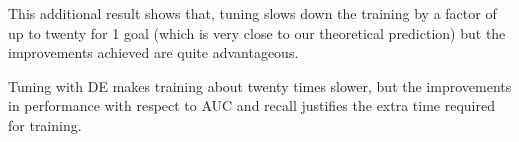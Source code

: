   This additional result shows that, tuning slows down the training by a factor of up to
  twenty for 1 goal (which is very close to our theoretical prediction) but the improvements achieved are quite advantageous.

\begin{lesson1}
    Tuning with DE makes training about twenty times slower, but the improvements in performance with respect to AUC and recall justifies the extra time required for training.
\end{lesson1}
